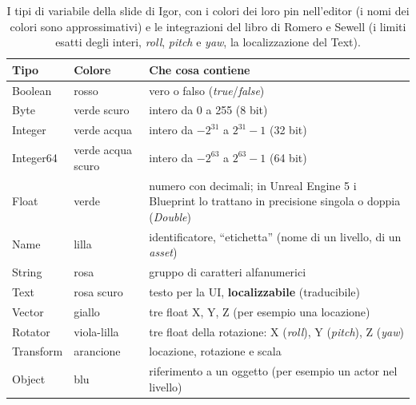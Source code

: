 \begin{table}[htbp]
\centering
\small
\begin{tabular}{@{}p{2.2cm}p{2.0cm}p{8.8cm}@{}}
\toprule
\textbf{Tipo} & \textbf{Colore} & \textbf{Che cosa contiene} \\
\midrule
Boolean & rosso & vero o falso (\emph{true}/\emph{false}) \\
Byte & verde scuro & intero da 0 a 255 (8 bit) \\
Integer & verde acqua & intero da $-2^{31}$ a $2^{31}-1$ (32 bit) \\
Integer64 & verde acqua scuro & intero da $-2^{63}$ a $2^{63}-1$ (64 bit) \\
Float & verde & numero con decimali; in Unreal Engine 5 i Blueprint lo trattano in
  precisione singola o doppia (\emph{Double}) \\
Name & lilla & identificatore, ``etichetta'' (nome di un livello, di un \emph{asset}) \\
String & rosa & gruppo di caratteri alfanumerici \\
Text & rosa scuro & testo per la UI, \textbf{localizzabile} (traducibile) \\
Vector & giallo & tre float X, Y, Z (per esempio una locazione) \\
Rotator & viola-lilla & tre float della rotazione: X (\emph{roll}), Y (\emph{pitch}),
  Z (\emph{yaw}) \\
Transform & arancione & locazione, rotazione e scala \\
Object & blu & riferimento a un oggetto (per esempio un actor nel livello) \\
\bottomrule
\end{tabular}
\caption{I tipi di variabile della slide di Igor, con i colori dei loro pin
nell'editor (i nomi dei colori sono approssimativi) e le integrazioni del libro di
Romero e Sewell (i limiti esatti degli interi, \emph{roll}, \emph{pitch} e \emph{yaw},
la localizzazione del Text).}
\label{ue2:tab:tipi}
\end{table}

